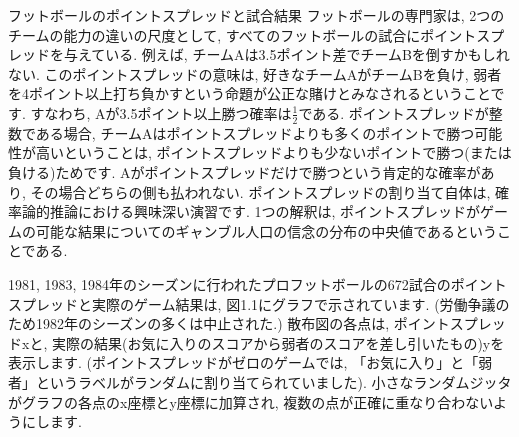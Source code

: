 \documentclass[10pt,dvipdfmx,a4]{beamer}
\begin{document}

\begin{frame}{フットボールのポイントスプレッドと試合結果}
フットボールの専門家は, 2つのチームの能力の違いの尺度として, すべてのフットボールの試合にポイントスプレッドを与えている.
例えば, チームAは3.5ポイント差でチームBを倒すかもしれない.
このポイントスプレッドの意味は, 好きなチームAがチームBを負け, 弱者を4ポイント以上打ち負かすという命題が公正な賭けとみなされるということです.
すなわち, Aが3.5ポイント以上勝つ確率は$\tfrac{1}{2}$である.
ポイントスプレッドが整数である場合, チームAはポイントスプレッドよりも多くのポイントで勝つ可能性が高いということは, ポイントスプレッドよりも少ないポイントで勝つ(または負ける)ためです.
Aがポイントスプレッドだけで勝つという肯定的な確率があり, その場合どちらの側も払われない.
ポイントスプレッドの割り当て自体は, 確率論的推論における興味深い演習です.
1つの解釈は, ポイントスプレッドがゲームの可能な結果についてのギャンブル人口の信念の分布の中央値であるということである.
\end{frame}


\begin{frame}
1981, 1983, 1984年のシーズンに行われたプロフットボールの672試合のポイントスプレッドと実際のゲーム結果は, 図1.1にグラフで示されています.
(労働争議のため1982年のシーズンの多くは中止された.)
散布図の各点は, ポイントスプレッドxと, 実際の結果(お気に入りのスコアから弱者のスコアを差し引いたもの)yを表示します.
(ポイントスプレッドがゼロのゲームでは, 「お気に入り」と「弱者」というラベルがランダムに割り当てられていました).
小さなランダムジッタがグラフの各点のx座標とy座標に加算され, 複数の点が正確に重なり合わないようにします.
\end{frame}

\end{document}
